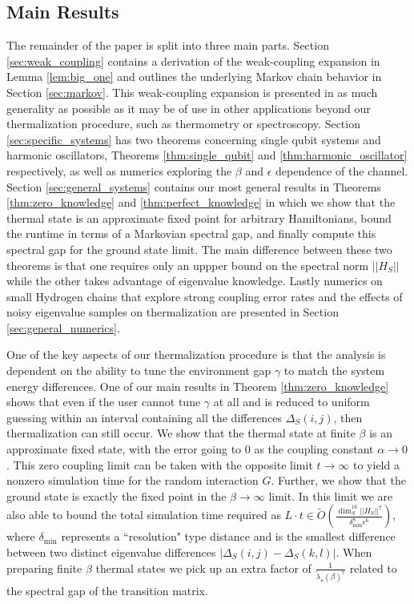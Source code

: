 \documentclass[
 amsmath,amssymb,
 aps,
onecolumn, 
nofootinbib]{revtex4-2}
\newcommand{\norm}[1]{\left|\left| #1 \right|\right|}
\newcommand{\bigotilde}[1]{\widetilde{O} \left( #1 \right)}
\begin{document}
\subsection{Main Results}
The remainder of the paper is split into three main parts. Section \ref{sec:weak_coupling} contains a derivation of the weak-coupling expansion in Lemma \ref{lem:big_one} and outlines the underlying Markov chain behavior in Section \ref{sec:markov}. This weak-coupling expansion is presented in as much generality as possible as it may be of use in other applications beyond our thermalization procedure, such as thermometry or spectroscopy. Section \ref{sec:specific_systems} has two theorems concerning single qubit systems and harmonic oscillators, Theorems \ref{thm:single_qubit} and \ref{thm:harmonic_oscillator} respectively, as well as numerics exploring the $\beta$ and $\epsilon$ dependence of the channel. Section \ref{sec:general_systems} contains our most general results in Theorems \ref{thm:zero_knowledge} and \ref{thm:perfect_knowledge} in which we show that the thermal state is an approximate fixed point for arbitrary Hamiltonians, bound the runtime in terms of a Markovian spectral gap, and finally compute this spectral gap for the ground state limit. The main difference between these two theorems is that one requires only an uppper bound on the spectral norm $\norm{H_S}$ while the other takes advantage of eigenvalue knowledge. Lastly numerics on small Hydrogen chains that explore strong coupling error rates and the effects of noisy eigenvalue samples on thermalization are presented in Section \ref{sec:general_numerics}. 

One of the key aspects of our thermalization procedure is that the analysis is dependent on the ability to tune the environment gap $\gamma$ to match the system energy differences. One of our main results in Theorem \ref{thm:zero_knowledge} shows that even if the user cannot tune $\gamma$ at all and is reduced to uniform guessing within an interval containing all the differences $\Delta_S(i,j)$, then thermalization can still occur. We show that the thermal state at finite $\beta$ is an approximate fixed state, with the error going to 0 as the coupling constant $\alpha \to 0$. This zero coupling limit can be taken with the opposite limit $t \to \infty$ to yield a nonzero simulation time for the random interaction $G$. Further, we show that the ground state is exactly the fixed point in the $\beta \to \infty$ limit. In this limit we are also able to bound the total simulation time required as $L \cdot t \in \bigotilde{\frac{\dim_S^{16} \norm{H_S}^7}{\delta_{\min}^8 \epsilon^6}} $, where $\delta_{\min}$ represents a ``resolution" type distance and is the smallest difference between two distinct eigenvalue differences $|\Delta_S(i,j) - \Delta_S(k,l)|$. When preparing finite $\beta$ thermal states we pick up an extra factor of $\frac{1}{\widetilde{\lambda}_\star(\beta)^7}$ related to the spectral gap of the transition matrix.
\end{document}

